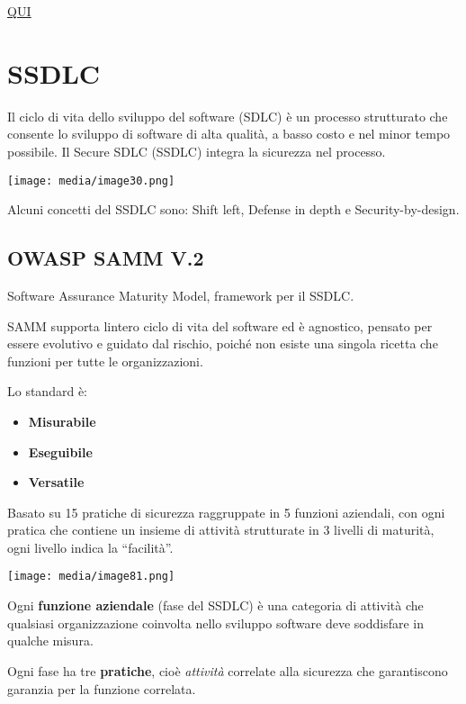 \href{https://virtuale.unibo.it/pluginfile.php/2032357/mod_resource/content/1/Laboratorio\%20di\%20sicurezza\%20dei\%20sistemi\%20informatici\%20e\%20privacy\%20-\%2005\%20Sviluppo\%20sicuro\%20-\%20V1R0.pdf}{\ul{QUI}}

\section{SSDLC}\label{ssdlc}

Il ciclo di vita dello sviluppo del software (SDLC) è un processo
strutturato che consente lo sviluppo di software di alta qualità, a
basso costo e nel minor tempo possibile. Il Secure SDLC (SSDLC) integra
la sicurezza nel processo.

\texttt{[image: media/image30.png]}

Alcuni concetti del SSDLC sono: Shift left, Defense in depth e
Security-by-design.

\subsection{OWASP SAMM V.2}\label{owasp-samm-v.2}

Software Assurance Maturity Model, framework per il SSDLC.

SAMM supporta l\textquotesingle intero ciclo di vita del software ed è
agnostico, pensato per essere evolutivo e guidato dal rischio, poiché
non esiste una singola ricetta che funzioni per tutte le organizzazioni.

Lo standard è:

\begin{itemize}
\item
  \textbf{Misurabile}
\item
  \textbf{Eseguibile}
\item
  \textbf{Versatile}
\end{itemize}

Basato su 15 pratiche di sicurezza raggruppate in 5 funzioni aziendali,
con ogni pratica che contiene un insieme di attività strutturate in 3
livelli di maturità, ogni livello indica la ``facilità''.

\texttt{[image: media/image81.png]}

Ogni \textbf{funzione aziendale} (fase del SSDLC) è una categoria di
attività che qualsiasi organizzazione coinvolta nello sviluppo software
deve soddisfare in qualche misura.

Ogni fase ha tre \textbf{pratiche}, cioè \emph{attività} correlate alla
sicurezza che garantiscono garanzia per la funzione correlata.

